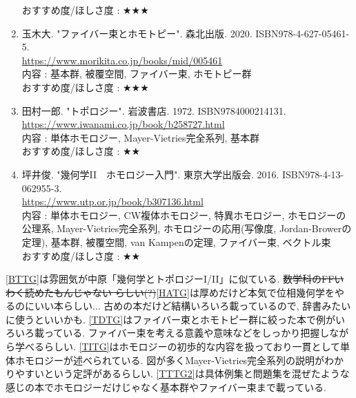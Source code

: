 \documentclass[10pt,a4paper]{jsarticle}
\begin{document}
\begin{enumerate}
        おすすめ度/ほしさ度 : $\bigstar \bigstar \bigstar $
        \item \label{TDTG} 玉木大. "ファイバー束とホモトピー". 森北出版. 2020. ISBN978-4-627-05461-5. \\
        \url{https://www.morikita.co.jp/books/mid/005461} \\
        内容 : 基本群, 被覆空間, ファイバー束, ホモトピー群\\
        おすすめ度/ほしさ度 : $\bigstar \bigstar \bigstar $
        \item \label{TITG} 田村一郎. "トポロジー". 岩波書店. 1972. ISBN9784000214131. \\
        \url{https://www.iwanami.co.jp/book/b258727.html} \\
        内容 : 単体ホモロジー, Mayer-Vietries完全系列, 基本群\\
        おすすめ度/ほしさ度 : $\bigstar \bigstar $
        \item \label{TTTG2} 坪井俊. "幾何学II　ホモロジー入門". 東京大学出版会. 2016. ISBN978-4-13-062955-3. \\
        \url{https://www.utp.or.jp/book/b307136.html} \\
        内容 : 単体ホモロジー, CW複体ホモロジー, 特異ホモロジー, ホモロジーの公理系, Mayer-Vietries完全系列, ホモロジーの応用(写像度, Jordan-Browerの定理), 基本群, 被覆空間, van Kampenの定理, ファイバー束, ベクトル束\\
        おすすめ度/ほしさ度 : $\bigstar \bigstar $
    \end{enumerate}\par
    \ref{BTTG}は雰囲気が中原「幾何学とトポロジーI/II」に似ている. \sout{数学科のFFいわく読めたもんじゃない らしい(?)}\ref{HATG}は厚めだけど本気で位相幾何学をやるのにいい本らしい... 古めの本だけど結構いろいろ載っているので, 辞書みたいに使うといいかも. \ref{TDTG}はファイバー束とホモトピー群に絞った本で例がいろいろ載っている. ファイバー束を考える意義や意味などをしっかり把握しながら学べるらしい. \ref{TITG}はホモロジーの初歩的な内容を扱っており一貫として単体ホモロジーが述べられている. 図が多くMayer-Vietries完全系列の説明がわかりやすいという定評があるらしい. \ref{TTTG2}は具体例集と問題集を混ぜたような感じの本でホモロジーだけじゃなく基本群やファイバー束まで載っている. 
\end{document}
